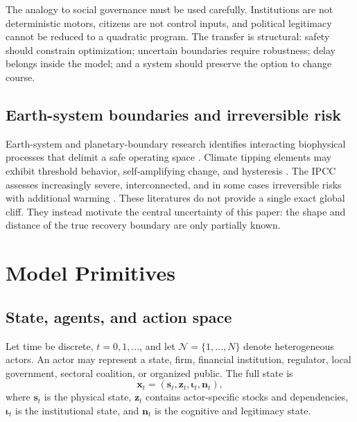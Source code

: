 \documentclass[11pt,a4paper]{article}
\numberwithin{equation}{section}
\theoremstyle{definition}
\theoremstyle{plain}
\theoremstyle{remark}
\newcommand{\state}{\bm{x}}
\newcommand{\inst}{\bm{\iota}}
\newcommand{\narr}{\bm{n}}
\begin{document}
The analogy to social governance must be used carefully. Institutions are not deterministic motors, citizens are not control inputs, and political legitimacy cannot be reduced to a quadratic program. The transfer is structural: safety should constrain optimization; uncertain boundaries require robustness; delay belongs inside the model; and a system should preserve the option to change course.

\subsection{Earth-system boundaries and irreversible risk}

Earth-system and planetary-boundary research identifies interacting biophysical processes that delimit a safe operating space \citep{rockstrom2023,richardson2023}. Climate tipping elements may exhibit threshold behavior, self-amplifying change, and hysteresis \citep{scheffer2009,armstrong2022}. The IPCC assesses increasingly severe, interconnected, and in some cases irreversible risks with additional warming \citep{ipcc2022,ipcc2023}. These literatures do not provide a single exact global cliff. They instead motivate the central uncertainty of this paper: the shape and distance of the true recovery boundary are only partially known.

\section{Model Primitives}

\subsection{State, agents, and action space}

Let time be discrete, $t=0,1,\ldots$, and let $\mathcal N=\{1,\ldots,N\}$ denote heterogeneous actors. An actor may represent a state, firm, financial institution, regulator, local government, sectoral coalition, or organized public. The full state is
\begin{equation}
  \state_t = (\bm{s}_t,\bm{z}_t,\inst_t,\narr_t),
  \label{eq:fullstate}
\end{equation}
where $\bm{s}_t$ is the physical state, $\bm{z}_t$ contains actor-specific stocks and dependencies, $\inst_t$ is the institutional state, and $\narr_t$ is the cognitive and legitimacy state.
\end{document}

